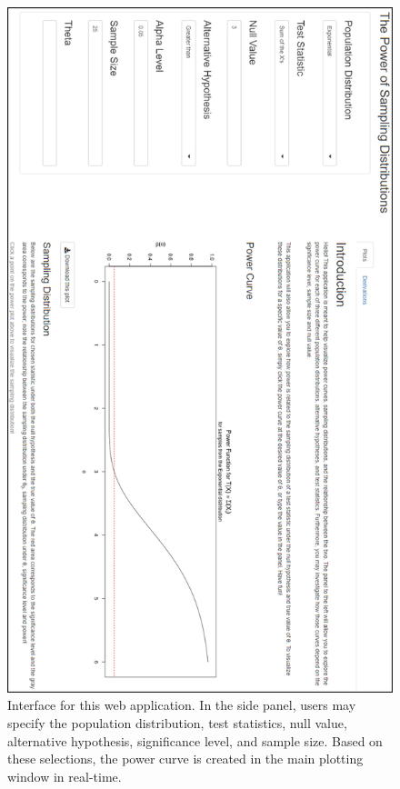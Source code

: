 \documentclass{TISE}
\begin{document}
\begin{figure}[H]
	\centering
	\includegraphics[scale=1]{app_layout.png}
	\caption{Interface for this web application. In the side panel, users may specify the population distribution, test statistics, null value, alternative hypothesis, significance level, and sample size. Based on these selections, the power curve is created in the main plotting window in real-time.}
\end{figure}
\end{document}
